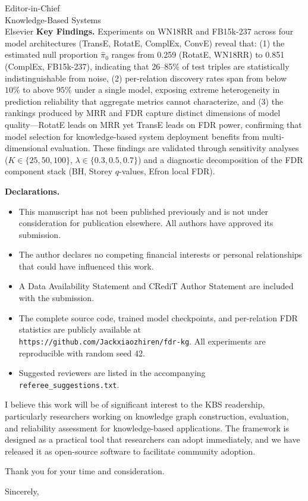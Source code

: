 \documentclass{letter}
\begin{document}
\begin{letter}{Editor-in-Chief \\
Knowledge-Based Systems \\
Elsevier}
\textbf{Key Findings.}
Experiments on WN18RR and FB15k-237 across four model architectures (TransE, RotatE, ComplEx, ConvE) reveal that: (1) the estimated null proportion $\hat{\pi}_0$ ranges from 0.259 (RotatE, WN18RR) to 0.851 (ComplEx, FB15k-237), indicating that 26--85\% of test triples are statistically indistinguishable from noise, (2) per-relation discovery rates span from below $10\%$ to above $95\%$ under a single model, exposing extreme heterogeneity in prediction reliability that aggregate metrics cannot characterize, and (3) the rankings produced by MRR and FDR capture distinct dimensions of model quality---RotatE leads on MRR yet TransE leads on FDR power, confirming that model selection for knowledge-based system deployment benefits from multi-dimensional evaluation. These findings are validated through sensitivity analyses ($K \in \{25, 50, 100\}$, $\lambda \in \{0.3, 0.5, 0.7\}$) and a diagnostic decomposition of the FDR component stack (BH, Storey $q$-values, Efron local FDR).

\textbf{Declarations.}
\begin{itemize}
    \item This manuscript has not been published previously and is not under consideration for publication elsewhere. All authors have approved its submission.
    \item The author declares no competing financial interests or personal relationships that could have influenced this work.
    \item A Data Availability Statement and CRediT Author Statement are included with the submission.
    \item The complete source code, trained model checkpoints, and per-relation FDR statistics are publicly available at \texttt{https://github.com/Jackxiaozhiren/fdr-kg}. All experiments are reproducible with random seed 42.
    \item Suggested reviewers are listed in the accompanying \texttt{referee\_suggestions.txt}.
\end{itemize}

I believe this work will be of significant interest to the KBS readership, particularly researchers working on knowledge graph construction, evaluation, and reliability assessment for knowledge-based applications. The framework is designed as a practical tool that researchers can adopt immediately, and we have released it as open-source software to facilitate community adoption.

Thank you for your time and consideration.

\closing{Sincerely,}

\end{letter}
\end{document}
